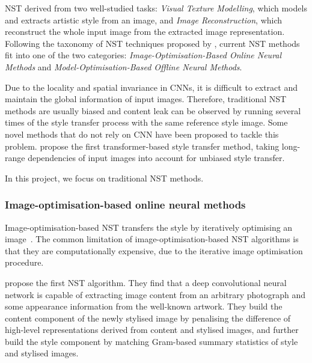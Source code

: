 \documentclass{article}
\begin{document}
NST derived from two well-studied tasks: \textit{Visual Texture Modelling}, which models and extracts artistic style from an image, 
and \textit{Image Reconstruction}, which reconstruct the whole input image from the extracted image representation.
Following the taxonomy of NST techniques proposed by \citet{jing2019neural}, 
current NST methods fit into one of the two categories: \textit{Image-Optimisation-Based Online Neural Methods}
and \textit{Model-Optimisation-Based Offline Neural Methods}.

Due to the locality and spatial invariance in CNNs, it is difficult to extract and maintain the global information of input images. 
Therefore, traditional NST methods are usually biased and content leak can be observed by running several times of the style transfer process with the same reference style image.
Some novel methods that do not rely on CNN have been proposed to tackle this problem. 
\citet{deng2021stytr} propose the first transformer-based style transfer method, 
taking long-range dependencies of input images into account for unbiased style transfer.

In this project, we focus on traditional NST methods.

\subsubsection{Image-optimisation-based online neural methods}

Image-optimisation-based NST transfers the style by iteratively optimising an image~\citep{gatys2015neural,li2017demystifying,risser2017stable,li2017laplacian,li2016combining}. 
The common limitation of image-optimisation-based NST algorithms is that they are computationally expensive, due to the iterative image optimisation procedure.


\citet{gatys2015neural,Gatys_2016_CVPR} propose the first NST algorithm. They find that a deep convolutional neural network is capable of extracting image content from an arbitrary photograph and some appearance information from the well-known artwork. 
They build the content component of the newly stylised image by penalising the difference of high-level representations derived from content and stylised images, and further build the style component by matching Gram-based summary statistics of style and stylised images.
\end{document}
